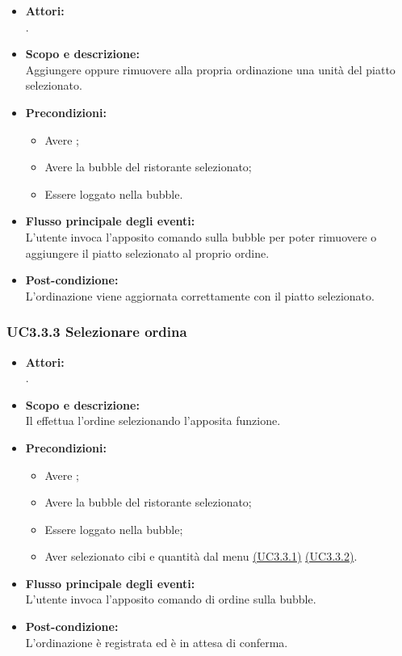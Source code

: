 \begin{itemize}
	\item \textbf{Attori:}
	\\.
	\item \textbf{Scopo e descrizione:} 
	\\Aggiungere oppure rimuovere alla propria ordinazione una unità del piatto selezionato.
	\item \textbf{Precondizioni:}
	\begin{itemize}
		\item Avere ;
		\item Avere la bubble del ristorante selezionato;
		\item Essere loggato nella bubble.
	\end{itemize}
	\item \textbf{Flusso principale degli eventi:}
	\\L'utente invoca l'apposito comando sulla bubble per poter rimuovere o aggiungere il piatto selezionato al proprio ordine.
	\item \textbf{Post-condizione:}
	\\L’ordinazione viene aggiornata correttamente con il piatto selezionato.
\end{itemize}

\subsubsection{UC3.3.3 Selezionare ordina} \label{UC3.3.3}

\begin{itemize}
	\item \textbf{Attori:}
	\\.
	\item \textbf{Scopo e descrizione:} 
	\\Il {} effettua l’ordine selezionando l’apposita funzione.
	\item \textbf{Precondizioni:}
	\begin{itemize}
		\item Avere ;
		\item Avere la bubble del ristorante selezionato;
		\item Essere loggato nella bubble;
		\item Aver selezionato cibi e quantità dal menu \hyperref[UC3.3.1]{(UC3.3.1)} \hyperref[UC3.3.2]{(UC3.3.2)}.
	\end{itemize}
	\item \textbf{Flusso principale degli eventi:}
	\\L'utente invoca l'apposito comando di ordine sulla bubble.
	\item \textbf{Post-condizione:}
	\\L’ordinazione è registrata ed è in attesa di conferma.
\end{itemize}

